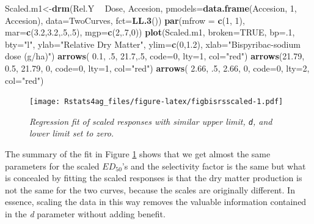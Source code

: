 \documentclass[letterpaper,]{book}
\newenvironment{Shaded}{\begin{snugshade}}{\end{snugshade}}
\newcommand{\DataTypeTok}[1]{\textcolor[rgb]{0.13,0.29,0.53}{#1}}
\newcommand{\DecValTok}[1]{\textcolor[rgb]{0.00,0.00,0.81}{#1}}
\newcommand{\FloatTok}[1]{\textcolor[rgb]{0.00,0.00,0.81}{#1}}
\newcommand{\KeywordTok}[1]{\textcolor[rgb]{0.13,0.29,0.53}{\textbf{#1}}}
\newcommand{\NormalTok}[1]{#1}
\newcommand{\OperatorTok}[1]{\textcolor[rgb]{0.81,0.36,0.00}{\textbf{#1}}}
\newcommand{\OtherTok}[1]{\textcolor[rgb]{0.56,0.35,0.01}{#1}}
\newcommand{\StringTok}[1]{\textcolor[rgb]{0.31,0.60,0.02}{#1}}
\begin{document}
\begin{Shaded}
\begin{Highlighting}[]
\NormalTok{Scaled.m1<-}\KeywordTok{drm}\NormalTok{(Rel.Y }\OperatorTok{~}\StringTok{ }\NormalTok{Dose, Accesion, }\DataTypeTok{pmodels=}\KeywordTok{data.frame}\NormalTok{(Accesion, }\DecValTok{1}\NormalTok{, Accesion),}
        \DataTypeTok{data=}\NormalTok{TwoCurves, }\DataTypeTok{fct=}\KeywordTok{LL.3}\NormalTok{())}
\KeywordTok{par}\NormalTok{(}\DataTypeTok{mfrow =} \KeywordTok{c}\NormalTok{(}\DecValTok{1}\NormalTok{, }\DecValTok{1}\NormalTok{), }\DataTypeTok{mar=}\KeywordTok{c}\NormalTok{(}\FloatTok{3.2}\NormalTok{,}\FloatTok{3.2}\NormalTok{,.}\DecValTok{5}\NormalTok{,.}\DecValTok{5}\NormalTok{), }\DataTypeTok{mgp=}\KeywordTok{c}\NormalTok{(}\DecValTok{2}\NormalTok{,.}\DecValTok{7}\NormalTok{,}\DecValTok{0}\NormalTok{))}
\KeywordTok{plot}\NormalTok{(Scaled.m1, }\DataTypeTok{broken=}\OtherTok{TRUE}\NormalTok{, }\DataTypeTok{bp=}\NormalTok{.}\DecValTok{1}\NormalTok{, }\DataTypeTok{bty=}\StringTok{"l"}\NormalTok{, }
     \DataTypeTok{ylab=}\StringTok{"Relative Dry Matter"}\NormalTok{, }\DataTypeTok{ylim=}\KeywordTok{c}\NormalTok{(}\DecValTok{0}\NormalTok{,}\FloatTok{1.2}\NormalTok{),}
     \DataTypeTok{xlab=}\StringTok{"Bispyribac-sodium dose (g/ha)"}\NormalTok{)}
\KeywordTok{arrows}\NormalTok{(  }\FloatTok{0.1}\NormalTok{, }\FloatTok{.5}\NormalTok{, }\FloatTok{21.7}\NormalTok{,.}\DecValTok{5}\NormalTok{, }\DataTypeTok{code=}\DecValTok{0}\NormalTok{, }\DataTypeTok{lty=}\DecValTok{1}\NormalTok{, }\DataTypeTok{col=}\StringTok{"red"}\NormalTok{)}
\KeywordTok{arrows}\NormalTok{(}\FloatTok{21.79}\NormalTok{, }\FloatTok{0.5}\NormalTok{, }\FloatTok{21.79}\NormalTok{,    }\DecValTok{0}\NormalTok{, }\DataTypeTok{code=}\DecValTok{0}\NormalTok{, }\DataTypeTok{lty=}\DecValTok{1}\NormalTok{, }\DataTypeTok{col=}\StringTok{"red"}\NormalTok{)}
\KeywordTok{arrows}\NormalTok{(  }\FloatTok{2.66}\NormalTok{, }\FloatTok{.5}\NormalTok{,   }\FloatTok{2.66}\NormalTok{,    }\DecValTok{0}\NormalTok{, }\DataTypeTok{code=}\DecValTok{0}\NormalTok{, }\DataTypeTok{lty=}\DecValTok{2}\NormalTok{, }\DataTypeTok{col=}\StringTok{"red"}\NormalTok{)}
\end{Highlighting}
\end{Shaded}

\begin{figure}
\centering
\texttt{[image: Rstats4ag\_files/figure-latex/figbisrsscaled-1.pdf]}
\caption{\label{fig:figbisrsscaled}\emph{Regression fit of scaled responses with similar upper limit, \texttt{d}, and lower limit set to zero.}}
\end{figure}

The summary of the fit in Figure \ref{fig:figbisrsscaled} shows that we get almost the same parameters for the scaled \(ED_{50}\)'s and the selectivity factor is the same but what is concealed by fitting the scaled responses is that the dry matter production is not the same for the two curves, because the scales are originally different. In essence, scaling the data in this way removes the valuable information contained in the \emph{d} parameter without adding benefit.
\end{document}

